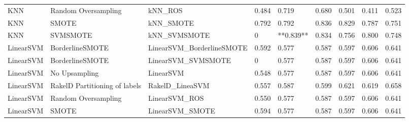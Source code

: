 \begin{tabular}{lllllllll}
                            KNN &           Random Oversampling &                                      kNN\_ROS & 0.484 &                     0.719 &                 0.680 &                  0.501 &                                   0.411 &    0.523 \\
                            KNN &                         SMOTE &                                    kNN\_SMOTE & 0.792 &                     0.792 &                 0.836 &                  0.829 &                                   0.787 &    0.751 \\
                            KNN &                      SVMSMOTE &                                 kNN\_SVMSMOTE &     0 &                 **0.839** &                 0.834 &                  0.756 &                                   0.800 &    0.748 \\
                      LinearSVM &               BorderlineSMOTE &                    LinearSVM\_BorderlineSMOTE & 0.592 &                     0.577 &                 0.587 &                  0.597 &                                   0.606 &    0.641 \\
                      LinearSVM &               BorderlineSMOTE &                           LinearSVM\_SVMSMOTE &     0 &                     0.577 &                 0.587 &                  0.597 &                                   0.606 &    0.641 \\
                      LinearSVM &                 No Upsampling &                                    LinearSVM & 0.548 &                     0.577 &                 0.587 &                  0.597 &                                   0.606 &    0.641 \\
                      LinearSVM & RakelD Partitioning of labels &                              RakelD\_LineaSVM & 0.557 &                     0.587 &                 0.599 &                  0.621 &                                   0.619 &    0.658 \\
                      LinearSVM &           Random Oversampling &                                LinearSVM\_ROS & 0.550 &                     0.577 &                 0.587 &                  0.597 &                                   0.606 &    0.641 \\
                      LinearSVM &                         SMOTE &                              LinearSVM\_SMOTE & 0.594 &                     0.577 &                 0.587 &                  0.597 &                                   0.606 &    0.641 \\

\end{tabular}
